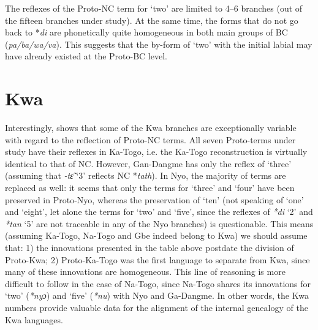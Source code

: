 The reflexes of the Proto-NC term for ‘two’ are limited to 4--6 branches (out of the fifteen branches under study). At the same time, the forms that do not go back to *\textit{di} are phonetically quite homogeneous in both main groups of BC (\textit{pa/ba/wa/va}). This suggests that the by-form of ‘two’ with the initial labial may have already existed at the Proto-BC level.


\section{Kwa}%

Interestingly,  shows that some of the Kwa branches are exceptionally variable with regard to the reflection of Proto-NC terms. All seven Proto-terms under study have their reflexes in Ka-Togo, i.e. the Ka-Togo reconstruction is virtually identical to that of NC. However, Gan-Dangme has only the reflex of ‘three’ (assuming that \textit{-t{\~{ɛ}}} ‘3’ reflects NC *\textit{tath}). In Nyo, the majority of terms are replaced as well: it seems that only the terms for ‘three’ and ‘four’ have been preserved in Proto-Nyo, whereas the preservation of ‘ten’ (not speaking of ‘one’ and ‘eight’, let alone the terms for ‘two’ and ‘five’, since the reflexes of \textit{*di} ‘2’ and \textit{*tan} ‘5’ are not traceable in any of the Nyo branches) is questionable. This means (assuming Ka-Togo, Na-Togo and Gbe indeed belong to Kwa) we should assume that: 1) the innovations presented in the table above postdate the division of Proto-Kwa; 2) Proto-Ka-Togo was the first language to separate from Kwa, since many of these innovations are homogeneous. This line of reasoning is more difficult to follow in the case of Na-Togo, since Na-Togo shares its innovations for ‘two’ (\textit{*ny}\textit{ɔ}) and ‘five’ (\textit{*nu}) with Nyo and Ga-Dangme. In other words, the Kwa numbers provide valuable data for the alignment of the internal genealogy of the Kwa languages.

